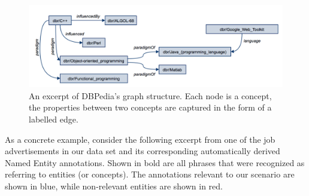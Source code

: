 \documentclass[conference]{IEEEtran}
\begin{document}
\begin{figure}[!htb]
\centering
\includegraphics[scale=0.4]{images/dbpedia-example-graph.png}
\caption{An excerpt of DBPedia's graph structure. Each node is a concept, the properties between two concepts are captured in the form of a labelled edge.}
\label{fig:dbpedia-example}
\end{figure}


As a concrete example, consider the following excerpt from one of the job advertisements in our data set and its corresponding automatically derived Named Entity annotations. Shown in bold are all phrases that were recognized as referring to entities (or concepts). The annotations relevant to our scenario are shown in blue, while non-relevant entities are shown in red. 
\vspace{1cm} %
\end{document}
